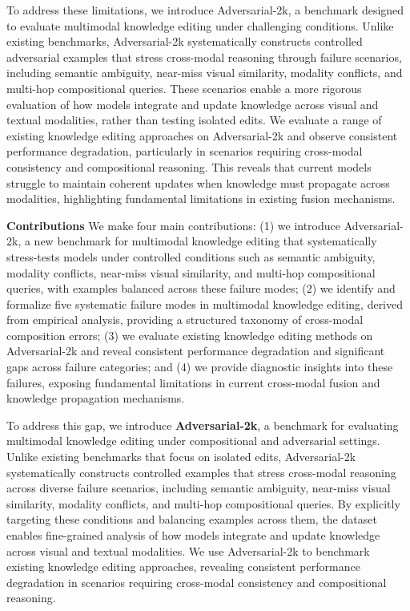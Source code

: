 \documentclass{article}
\begin{document}
\par To address these limitations, we introduce Adversarial-2k, a benchmark designed to evaluate multimodal knowledge editing under challenging conditions. Unlike existing benchmarks, Adversarial-2k systematically constructs controlled adversarial examples that stress cross-modal reasoning through failure scenarios, including semantic ambiguity, near-miss visual similarity, modality conflicts, and multi-hop compositional queries. These scenarios enable a more rigorous evaluation of how models integrate and update knowledge across visual and textual modalities, rather than testing isolated edits. We evaluate a range of existing knowledge editing approaches on Adversarial-2k and observe consistent performance degradation, particularly in scenarios requiring cross-modal consistency and compositional reasoning. This reveals that current models struggle to maintain coherent updates when knowledge must propagate across modalities, highlighting fundamental limitations in existing fusion mechanisms.

\par \textbf{Contributions} We make four main contributions: (1) we introduce Adversarial-2k, a new benchmark for multimodal knowledge editing that systematically stress-tests models under controlled conditions such as semantic ambiguity, modality conflicts, near-miss visual similarity, and multi-hop compositional queries, with examples balanced across these failure modes; (2) we identify and formalize five systematic failure modes in multimodal knowledge editing, derived from empirical analysis, providing a structured taxonomy of cross-modal composition errors; (3) we evaluate existing knowledge editing methods on Adversarial-2k and reveal consistent performance degradation and significant gaps across failure categories; and (4) we provide diagnostic insights into these failures, exposing fundamental limitations in current cross-modal fusion and knowledge propagation mechanisms.


\par To address this gap, we introduce \textbf{Adversarial-2k}, a benchmark for evaluating multimodal knowledge editing under compositional and adversarial settings. Unlike existing benchmarks that focus on isolated edits, Adversarial-2k systematically constructs controlled examples that stress cross-modal reasoning across diverse failure scenarios, including semantic ambiguity, near-miss visual similarity, modality conflicts, and multi-hop compositional queries. By explicitly targeting these conditions and balancing examples across them, the dataset enables fine-grained analysis of how models integrate and update knowledge across visual and textual modalities. We use Adversarial-2k to benchmark existing knowledge editing approaches, revealing consistent performance degradation in scenarios requiring cross-modal consistency and compositional reasoning.
\end{document}
